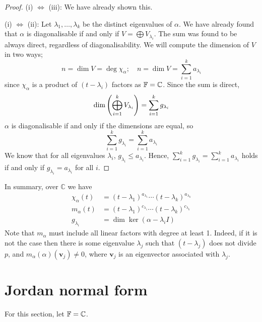 \documentclass[a4paper]{article}
\begin{document}
\begin{proof}
	(i) $\iff$ (iii): We have already shown this. 

	(i) $\iff$ (ii): Let \( \lambda_1, \dots, \lambda_k \) be the distinct eigenvalues of \( \alpha \).
	We have already found that \( \alpha \) is diagonalisable if and only if \( V = \bigoplus V_{\lambda_i} \).
	The sum was found to be always direct, regardless of diagonalisability.
	We will compute the dimension of \( V \) in two ways;
	\[
		n = \dim V = \deg \chi_\alpha;\quad n = \dim V = \sum_{i=1}^k a_{\lambda_i}
	\]
	since \( \chi_\alpha \) is a product of \( (t-\lambda_i) \) factors as \( {\mathbb{F}} = \mathbb C \).
	Since the sum is direct,
	\[
		\dim \qty(\bigoplus_{i=1}^k V_{\lambda_i}) = \sum_{i=1}^k g_{\lambda_i}
	\]
	\( \alpha \) is diagonalisable if and only if the dimensions are equal, so
	\[
		\sum_{i=1}^k g_{\lambda_i} = \sum_{i=1}^k a_{\lambda_i}
	\]
	We know that for all eigenvalues \( \lambda_i \), \( g_{\lambda_i} \leq a_{\lambda_i} \).
	Hence, \( \sum_{i=1}^k g_{\lambda_i} = \sum_{i=1}^k a_{\lambda_i} \) holds if and only if \( g_{\lambda_i} = a_{\lambda_i} \) for all \( i \).
\end{proof}

In summary, over $ \mathbb{C} $ we have 
\begin{align*}
	\chi_\alpha(t) & = (t-\lambda_1)^{a_{\lambda_1}}\cdots (t-\lambda_k)^{a_{\lambda_k}}\\ 
	m_\alpha(t) & = (t-\lambda_1)^{c_{\lambda_1}}\cdots (t-\lambda_k)^{c_{\lambda_k}}\\ 
	g_{\lambda_i} &= \dim \ker (\alpha- \lambda_i I)
\end{align*}
Note that $ m_\alpha $ must include all linear factors with degree at least 1. Indeed, if it is not the case then there is some eigenvalue $ \lambda_j $ such that $ (t-\lambda_j) $ does not divide $p$, and $ m_\alpha(\alpha)(\mathbf{v}_j)\neq 0 $, where $\mathbf{v}_j$ is an eigenvector associated with $\lambda_j$.

\section{Jordan normal form}
For this section, let \( {\mathbb{F}} = \mathbb C \).
\end{document}
